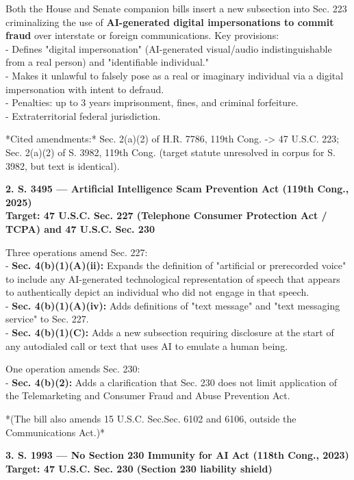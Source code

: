 \documentclass[11pt]{article}
\begin{document}
Both the House and Senate companion bills insert a new subsection into Sec. 223 criminalizing the use of \textbf{AI-generated digital impersonations to commit fraud} over interstate or foreign communications. Key provisions: \\
- Defines "digital impersonation" (AI-generated visual/audio indistinguishable from a real person) and "identifiable individual." \\
- Makes it unlawful to falsely pose as a real or imaginary individual via a digital impersonation with intent to defraud. \\
- Penalties: up to 3 years imprisonment, fines, and criminal forfeiture. \\
- Extraterritorial federal jurisdiction.

*Cited amendments:* Sec. 2(a)(2) of H.R. 7786, 119th Cong. -\textgreater{} 47 U.S.C. 223; Sec. 2(a)(2) of S. 3982, 119th Cong. (target statute unresolved in corpus for S. 3982, but text is identical).

\textbf{2. \textbf{S. 3495 --- Artificial Intelligence Scam Prevention Act} (119th Cong., 2025)} \\
\textbf{Target: 47 U.S.C. Sec. 227 (Telephone Consumer Protection Act / TCPA) and 47 U.S.C. Sec. 230}

Three operations amend Sec. 227: \\
- \textbf{Sec. 4(b)(1)(A)(ii):} Expands the definition of "artificial or prerecorded voice" to include any AI-generated technological representation of speech that appears to authentically depict an individual who did not engage in that speech. \\
- \textbf{Sec. 4(b)(1)(A)(iv):} Adds definitions of "text message" and "text messaging service" to Sec. 227. \\
- \textbf{Sec. 4(b)(1)(C):} Adds a new subsection requiring disclosure at the start of any autodialed call or text that uses AI to emulate a human being.

One operation amends Sec. 230: \\
- \textbf{Sec. 4(b)(2):} Adds a clarification that Sec. 230 does not limit application of the Telemarketing and Consumer Fraud and Abuse Prevention Act.

*(The bill also amends 15 U.S.C. Sec.Sec. 6102 and 6106, outside the Communications Act.)*

\textbf{3. \textbf{S. 1993 --- No Section 230 Immunity for AI Act} (118th Cong., 2023)} \\
\textbf{Target: 47 U.S.C. Sec. 230 (Section 230 liability shield)}
\end{document}
